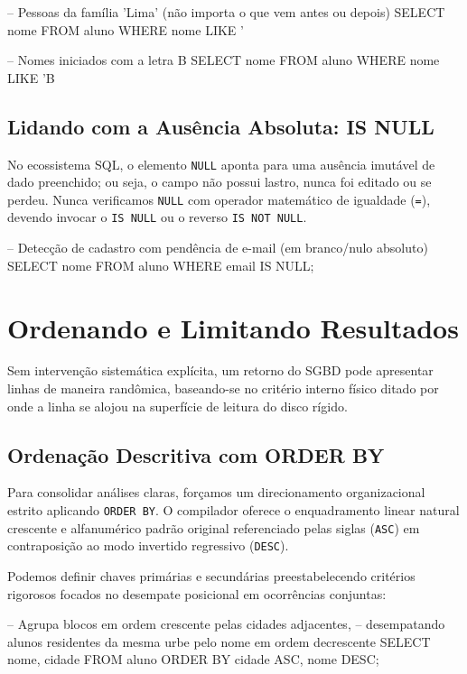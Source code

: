 \begin{sqlcode}
-- Pessoas da família 'Lima' (não importa o que vem antes ou depois)
SELECT nome FROM aluno WHERE nome LIKE '%

-- Nomes iniciados com a letra B
SELECT nome FROM aluno WHERE nome LIKE 'B%
\end{sqlcode}

\subsection{Lidando com a Ausência Absoluta: IS NULL}
No ecossistema SQL, o elemento \texttt{NULL} aponta para uma ausência imutável de dado preenchido; ou seja, o campo não possui lastro, nunca foi editado ou se perdeu. Nunca verificamos \texttt{NULL} com operador matemático de igualdade (\texttt{=}), devendo invocar o \texttt{IS NULL} ou o reverso \texttt{IS NOT NULL}.

\begin{sqlcode}
-- Detecção de cadastro com pendência de e-mail (em branco/nulo absoluto)
SELECT nome FROM aluno WHERE email IS NULL;
\end{sqlcode}

\section{Ordenando e Limitando Resultados}

Sem intervenção sistemática explícita, um retorno do SGBD pode apresentar linhas de maneira randômica, baseando-se no critério interno físico ditado por onde a linha se alojou na superfície de leitura do disco rígido.

\subsection{Ordenação Descritiva com ORDER BY}
Para consolidar análises claras, forçamos um direcionamento organizacional estrito aplicando \texttt{ORDER BY}. O compilador oferece o enquadramento linear natural crescente e alfanumérico padrão original referenciado pelas siglas (\texttt{ASC}) em contraposição ao modo invertido regressivo (\texttt{DESC}).

Podemos definir chaves primárias e secundárias preestabelecendo critérios rigorosos focados no desempate posicional em ocorrências conjuntas:

\begin{sqlcode}
-- Agrupa blocos em ordem crescente pelas cidades adjacentes, 
-- desempatando alunos residentes da mesma urbe pelo nome em ordem decrescente
SELECT nome, cidade FROM aluno ORDER BY cidade ASC, nome DESC;
\end{sqlcode}

